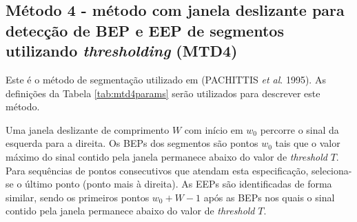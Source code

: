 \begin{figure}[!htb]
\begin{center}
	\end{center}
\end{figure}

\subsection{Método 4 - método com janela deslizante para detecção de BEP e EEP de segmentos utilizando \emph{thresholding} (MTD4)}

Este é o método de segmentação utilizado em (PACHITTIS \emph{et al}. 1995). As definições da Tabela \ref{tab:mtd4params} serão utilizados para descrever este método.

\begin{table}[htb]
\end{table}

Uma janela deslizante de comprimento $W$ com início em $w_0$ percorre o sinal da esquerda para a direita. Os BEPs dos segmentos são pontos $w_0$ tais que o valor máximo do sinal contido pela janela permanece abaixo do valor de \emph{threshold} $T$. Para sequências de pontos consecutivos que atendam esta especificação, seleciona-se o último ponto (ponto mais à direita). As EEPs são identificadas de forma similar, sendo os primeiros pontos $w_0 + W - 1$ após as BEPs nos quais o sinal contido pela janela permanece abaixo do valor de \emph{threshold} $T$.

